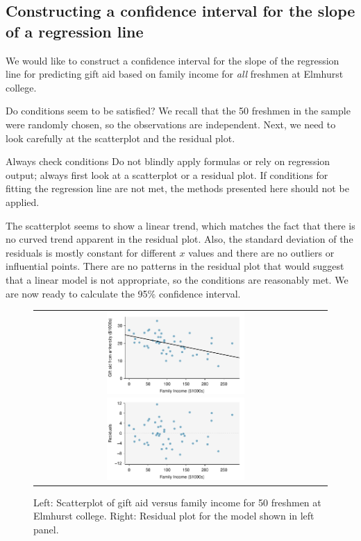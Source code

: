 \subsection{Constructing a confidence interval for the slope of a regression line}

We would like to construct a confidence interval for the slope of the regression line for predicting gift aid based on family income for \emph{all} freshmen at Elmhurst college.  



Do conditions seem to be satisfied?  We recall that the 50 freshmen in the sample were randomly chosen, so the observations are independent.  Next, we need to look carefully at the scatterplot and the residual plot.  


\begin{onebox}{Always check conditions}
Do not blindly apply formulas or rely on regression output; always first look at a scatterplot or a residual plot.  If conditions for fitting the regression line are not met, the methods presented here should not be applied. 
\end{onebox}

The scatterplot seems to show a linear trend, which matches the fact that there is no curved trend apparent in the residual plot.  Also, the standard deviation of the residuals is mostly constant for different $x$ values and there are no outliers or influential points.  There are no patterns in the residual plot that would suggest that a linear model is not appropriate, so the conditions are reasonably met.  We are now ready to calculate the 95\% confidence interval.  

\begin{figure}%
   \centering
  \begin{tabular}{cc}
   \includegraphics[width=0.5\textwidth]{ch_regr_simple_linear/figures/elmhurstInference/elmhurstScatter}
   \includegraphics[width=0.5\textwidth]{ch_regr_simple_linear/figures/elmhurstInference/elmhurstResidual}
\end{tabular}
   \caption{Left: Scatterplot of gift aid versus family income for 50 freshmen at Elmhurst college.  Right: Residual plot for the model shown in left panel.  }
\label{elmhurstInferencePlots}
\end{figure}




